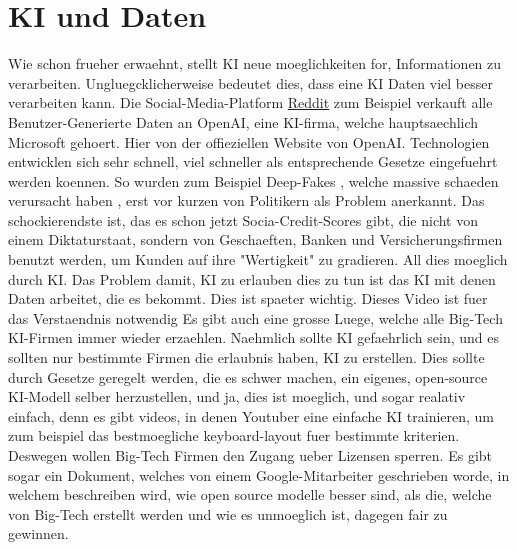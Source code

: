 \documentclass{report}
\begin{document}
\section{KI und Daten}
Wie schon frueher erwaehnt, stellt KI neue moeglichkeiten for, Informationen zu verarbeiten. Ungluegcklicherweise bedeutet dies, dass eine KI Daten viel besser verarbeiten kann.
Die Social-Media-Platform \hyperlink{reddit.com}{Reddit} zum Beispiel verkauft alle Benutzer-Generierte Daten an OpenAI, eine KI-firma, welche hauptsaechlich Microsoft gehoert. \citep{openai-site}
Hier von der offieziellen Website von OpenAI. \citep{openai-reddit-deal}
\newline
\newline
Technologien entwicklen sich sehr schnell, viel schneller als entsprechende Gesetze eingefuehrt werden koennen. So wurden zum Beispiel Deep-Fakes \citep{deepfakes}, welche massive schaeden verursacht haben \citep{deepfakes-scam}, erst vor kurzen von Politikern als Problem anerkannt.
\newline
\newline
Das schockierendste ist, das es schon jetzt Socia-Credit-Scores gibt, die nicht von einem Diktaturstaat, sondern von Geschaeften, Banken und Versicherungsfirmen benutzt werden, um Kunden auf ihre "Wertigkeit" zu gradieren. All dies moeglich durch KI.
Das Problem damit, KI zu erlauben dies zu tun ist das KI mit denen Daten arbeitet, die es bekommt. Dies ist spaeter wichtig.
\citep{ai-social-credit-scores} Dieses Video ist fuer das Verstaendnis notwendig
\newline
\newline
Es gibt auch eine grosse Luege, welche alle Big-Tech KI-Firmen immer wieder erzaehlen. Naehmlich sollte KI gefaehrlich sein, und es sollten nur bestimmte Firmen die erlaubnis haben, KI zu erstellen. Dies sollte durch Gesetze geregelt werden, die es schwer machen, ein eigenes, open-source KI-Modell selber herzustellen, und ja, dies ist moeglich, und sogar realativ einfach, denn es gibt videos, in denen Youtuber eine einfache KI trainieren, um zum beispiel das bestmoegliche keyboard-layout fuer bestimmte kriterien. Deswegen wollen Big-Tech Firmen den Zugang ueber Lizensen sperren. \citep{training-an-ai-model}
\newline
Es gibt sogar ein Dokument, welches von einem Google-Mitarbeiter geschrieben worde, in welchem beschreiben wird, wie open source modelle besser sind, als die, welche von Big-Tech erstellt werden und wie es unmoeglich ist, dagegen fair zu gewinnen. \citep{google-enginner-says-big-ai-sucks}
\end{document}
